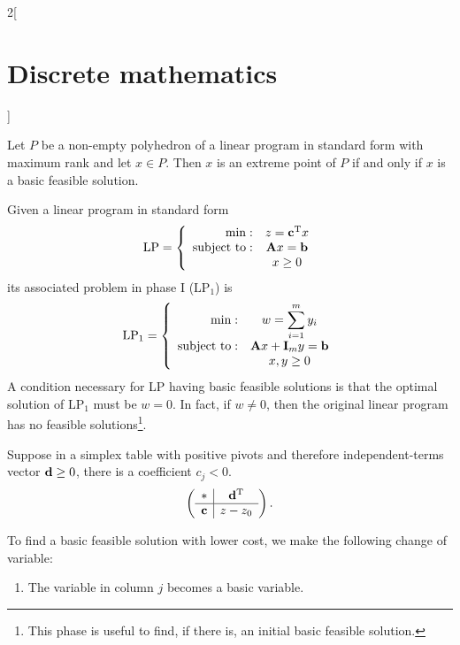 \documentclass[../../../main.tex]{subfiles}
\begin{document}
\begin{multicols}{2}[\section{Discrete mathematics}]
\begin{prop}
    \end{prop}
    \begin{theorem}
        Let $P$ be a non-empty polyhedron of a linear program in standard form with maximum rank and let $x\in P$. Then $x$ is an extreme point of $P$ if and only if $x$ is a basic feasible solution.
    \end{theorem}
    \begin{definition}
        Given a linear program in standard form $$\text{LP}=\left\{\begin{array}{rc}
                \min:              & z=\vb{c}^{\mathrm{T}}x             \\
                \text{subject to}: & \vb{A}x=\vb{b} \\
                                   & x\geq 0
            \end{array}\right.$$ its associated problem in phase I ($\text{LP}_1$) is $$\text{LP}_1=\left\{\begin{array}{rc}
                \min:              & \displaystyle w=\sum_{i=1}^my_i               \\
                \text{subject to}: & \vb{A}x+\vb{I}_my=\vb{b} \\
                                   & x,y\geq 0
            \end{array}\right.$$
        A condition necessary for LP having basic feasible solutions is that the optimal solution of $\text{LP}_1$ must be $w=0$. In fact, if $w\ne 0$, then the original linear program has no feasible solutions\footnote{This phase is useful to find, if there is, an initial basic feasible solution.}.
    \end{definition}
    \begin{prop}
        Suppose in a simplex table with positive pivots and therefore independent-terms vector $\vb{d}\geq 0$, there is a coefficient $c_j<0$. $$\left(\begin{array}{c|c}
                    *             & \vb{d}^{\mathrm{T}} \\
                    \hline
                    \vb{c} & z-z_0
                \end{array}\right).$$
    \end{prop}
    To find a basic feasible solution with lower cost, we make the following change of variable:
    \begin{enumerate}
        \item The variable in column $j$ becomes a basic variable.

\end{enumerate}
\end{multicols}
\end{document}

